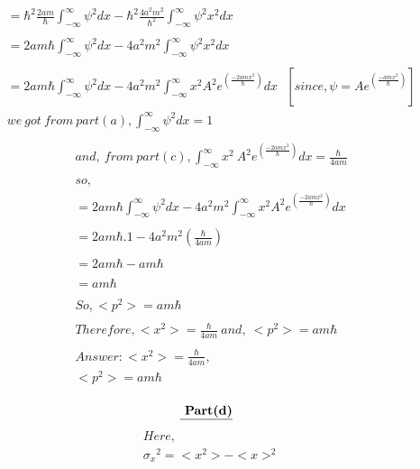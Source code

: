 \documentclass{article}
\begin{document}
\begin{homeworkProblem}
\begin{align*}
  &=\hbar^{2}\frac{2 am}{\hbar}\int_{-\infty}^{\infty}\psi^{2} dx - \hbar^{2} \frac{4a^{2}m^{2}}{\hbar^{2}}\int_{-\infty}^{\infty} \psi^{2} x^{2} dx  \\\\
  &=2am\hbar \int_{-\infty}^{\infty}\psi^{2} dx - {4a^{2}m^{2}}\int_{-\infty}^{\infty} \psi^{2} x^{2} dx  \\\\
  &=2am\hbar \int_{-\infty}^{\infty}\psi^{2} dx - {4a^{2}m^{2}}\int_{-\infty}^{\infty}  x^{2} A^{2} e^{(\frac{-2amx^{2}}{\hbar})} dx \ \  \ [since, \psi =A e^{( \frac{-amx^{2}}{\hbar})}] \\
  & we\ got\ from\ part(a),\int_{-\infty}^{\infty}\psi^{2} dx =1\\
\end{align*}
\newpage\vspace{5mm}
\hspace{20mm}
\large
\begin{align*}
  &and,\ from\ part(c),  \int_{-\infty}^{\infty}x^{2}\ A^{2} e^{(\frac{-2amx^{2}}{\hbar})} dx= {\frac{\hbar}{4am}}\\\\
  &so,\\
  &=2am\hbar \int_{-\infty}^{\infty}\psi^{2} dx - {4a^{2}m^{2}}\int_{-\infty}^{\infty}  x^{2} A^{2} e^{(\frac{-2amx^{2}}{\hbar})} dx\\\\
  &=2am\hbar .1 -4a^{2}m^{2} ({\frac{\hbar}{4am}})\\\\
  &= 2am\hbar -am\hbar\\\\
  &=am\hbar\\\\
  &So,<p^{2}>=am\hbar\\\\
  &Therefore, <x^{2}> = {\frac{\hbar}{4am}}\ and, \ <p^{2}>=am\hbar\\\\
  &Answer:<x^{2}> = {\frac{\hbar}{4am}},\\
  &<p^{2}>=am\hbar\\\\
\end{align*}
\newpage\vspace{5mm}
 \[
    \textbf{\underline{ Part(d)}}
    \]
\hspace{20mm}
\large
\begin{align*}
  &Here,\\
  &{\sigma_{x}}^{2}= <x^{2}> - <x>^{2}\\\\

\end{align*}
\end{homeworkProblem}
\end{document}
